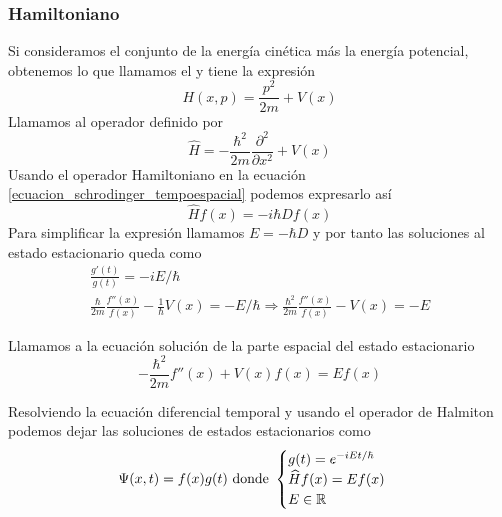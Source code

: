 \subsubsection{Hamiltoniano}
Si consideramos el conjunto de la energía cinética más la energía potencial, obtenemos lo que llamamos el  y tiene la expresión
\begin{equation}
    \label{halmitoniano}
    H(x,p)=\frac{p^2}{2m}+V(x)
\end{equation}
Llamamos  al operador definido por
\begin{equation}
    \label{operador_hamiltoniano}
    \widehat{H}=-\frac{\hbar^2}{2m}\frac{\partial^2}{\partial x^2}+V(x)
\end{equation}
Usando el operador Hamiltoniano en la ecuación \ref{ecuacion_schrodinger_tempoespacial} podemos expresarlo así
\begin{equation*}
    \widehat{H}f(x)=-i\hbar Df(x)
\end{equation*}
Para simplificar la expresión llamamos $E=-\hbar D$ y por tanto las soluciones al estado estacionario queda como
\begin{gather*}
    \frac{g'(t)}{g(t)}=-iE/\hbar
    \\
    \frac{\hbar}{2m}\frac{f''(x)}{f(x)}-\frac{1}{\hbar}V(x)=-E/\hbar\Rightarrow \frac{\hbar^2}{2m}\frac{f''(x)}{f(x)}-V(x)=-E
\end{gather*}

\begin{definicion}
    Llamamos  a la ecuación solución de la parte espacial del estado estacionario
    \begin{equation}
        \label{ecuacion_schrodinger_tempoespacial}
        -\frac{\hbar^2}{2m}f''(x)+V(x)f(x)= Ef(x)
    \end{equation}
\end{definicion}

Resolviendo la ecuación diferencial temporal y usando el operador de Halmiton podemos dejar las soluciones de estados estacionarios como
\begin{equation}
    \label{solucion_estado_estacionario}
    \Psi(x,t)=f(x)g(t)\text{ donde }
    \begin{cases}
        g(t)=e^{-iEt/\hbar}\\
        \widehat{H}f(x)=Ef(x)\\
        E\in\mathbb{R}
    \end{cases}
\end{equation}

